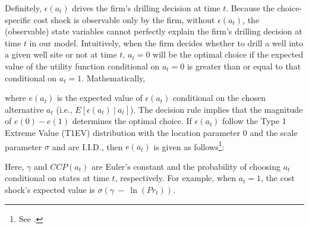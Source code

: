 Definitely, $\epsilon(a_{t})$ drives the firm's drilling decision at time $t$. Because the choice-specific cost shock is observable only by the firm, without $\epsilon(a_{t})$, the (observable) state variables cannot perfectly explain the firm's drilling decision at time $t$ in our model. Intuitively, when the firm decides whether to drill a well into a given well site or not at time $t$, $a_{t} = 0$ will be the optimal choice if the expected value of the utility function conditional on $a_{t} = 0$ is greater than or equal to that conditional on $a_{t} = 1$. Mathematically, 

where $e(a_{t})$ is the expected value of $\epsilon(a_{t})$ conditional on the chosen alternative $a_{t}$ (i.e., $E \left[ \epsilon(a_{t}) \ | \ a_{t} \right]$). The decision rule implies that the magnitude of $e(0) - e(1)$ determines the optimal choice. If $\epsilon(a_{t})$ follow the Type 1 Extreme Value (T1EV) distribution with the location parameter 0 and the scale parameter $\sigma$ and are I.I.D., then $e(a_{t})$ is given as follows\footnote{See \cite{Euler-Equations-for-the-Estimation-of-Dynamic-Discrete-Choice-Structural-Models_Aguirregabiria-and-Magesan_2013}.}:

Here, $\gamma$ and $CCP(a_{t})$ are Euler's constant and the probability of choosing $a_{t}$ conditional on states at time $t$, respectively. For example, when $a_{t} = 1$, the cost shock's expected value is $\sigma \left( \gamma \ - \ \ln (Pr_{t}) \right)$. 
